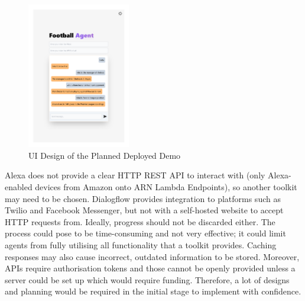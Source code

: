 \documentclass[10pt,a4paper,twocolumn]{article}
\begin{document}
\begin{figure}[h]
    \centering
    \includegraphics[width=0.4\textwidth]{assets/ui-preview.pdf}
    \caption*{UI Design of the Planned Deployed Demo}
\end{figure}

Alexa does not provide a clear HTTP REST API to interact with (only Alexa-enabled devices from Amazon onto ARN Lambda Endpoints), so another toolkit may need to be chosen. Dialogflow provides integration to platforms such as Twilio and Facebook Messenger, but not with a self-hosted website to accept HTTP requests from. Ideally, progress should not be discarded either. The process could pose to be time-consuming and not very effective; it could limit agents from fully utilising all functionality that a toolkit provides. Caching responses may also cause incorrect, outdated information to be stored. Moreover, APIs require authorisation tokens and those cannot be openly provided unless a server could be set up which would require funding. Therefore, a lot of designs and planning would be required in the initial stage to implement with confidence.
\end{document}
